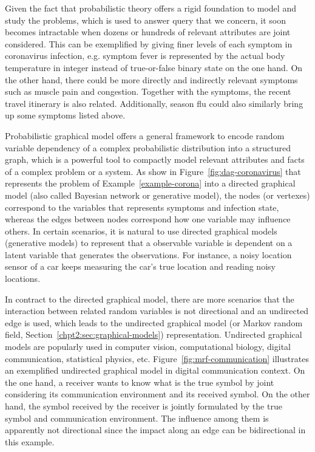 Given the fact that probabilistic theory offers a rigid foundation to model and study the problems, which is used to answer query that we concern, it soon becomes intractable when dozens or hundreds of relevant attributes are joint considered. This can be exemplified by giving finer levels of each symptom in coronavirus infection, e.g. symptom fever is represented by the actual body temperature in integer instead of true-or-false binary state on the one hand. On the other hand, there could be more directly and indirectly relevant symptoms such as muscle pain and congestion. Together with the symptoms, the recent travel itinerary is also related. Additionally, season flu could also similarly bring up some symptoms listed above. 

Probabilistic graphical model offers a general framework to encode random variable dependency of a complex probabilistic distribution into a structured graph, which is a powerful tool to compactly model relevant attributes and facts of a complex problem or a system. As show in Figure~\ref{fig:dag-coronavirus} that represents the problem of Example~\ref{example-corona} into a directed graphical model (also called Bayesian network or generative model), the nodes (or vertexes) correspond to the variables that represents symptoms and infection state, whereas the edges between nodes correspond how one variable may influence others. In certain scenarios, it is natural to use directed graphical models (generative models) to represent that a observable variable is dependent on a latent variable that generates the observations. For instance, a noisy location sensor of a car keeps measuring the car's true location and reading noisy locations. 

In contract to the directed graphical model, there are more scenarios that the interaction between related random variables is not directional and an undirected edge is used, which leads to the undirected graphical model (or Markov random field, Section~\ref{chpt2:sec:graphical-models}) representation. Undirected graphical models are popularly used in computer vision, computational biology, digital communication, statistical physics, etc. Figure~\ref{fig:mrf-communication} illustrates an exemplified undirected graphical model in digital communication context. On the one hand, a receiver wants to know what is the true symbol by joint considering its communication environment and its received symbol. On the other hand, the symbol received by the receiver is jointly formulated by the true symbol and communication environment. The influence among them is apparently not directional since the impact along an edge can be bidirectional in this example.

